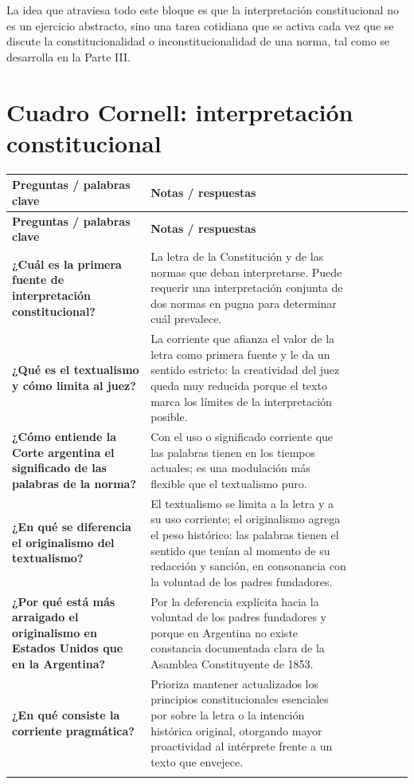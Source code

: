 \documentclass[12pt,oneside]{book}
\newcommand{\cornellhead}{%
    \toprule
    \textbf{Preguntas / palabras clave} & \textbf{Notas / respuestas} \\
    \midrule}
\newcommand{\cornellsep}{\\ \addlinespace \cmidrule[0.2pt]{1-2} \addlinespace}
\begin{document}
La idea que atraviesa todo este bloque es que la interpretación constitucional no es un ejercicio abstracto, sino una tarea cotidiana que se activa cada vez que se discute la constitucionalidad o inconstitucionalidad de una norma, tal como se desarrolla en la Parte III.

\section{Cuadro Cornell: interpretación constitucional}

\begin{longtable}{Q{0.28\textwidth}Q{\textwidth\relax}}
\cornellhead
\endfirsthead
\cornellhead
\endhead

\textbf{¿Cuál es la primera fuente de interpretación constitucional?} &
La letra de la Constitución y de las normas que deban interpretarse. Puede requerir una interpretación conjunta de dos normas en pugna para determinar cuál prevalece.
\cornellsep

\textbf{¿Qué es el textualismo y cómo limita al juez?} &
La corriente que afianza el valor de la letra como primera fuente y le da un sentido estricto: la creatividad del juez queda muy reducida porque el texto marca los límites de la interpretación posible.
\cornellsep

\textbf{¿Cómo entiende la Corte argentina el significado de las palabras de la norma?} &
Con el uso o significado corriente que las palabras tienen en los tiempos actuales; es una modulación más flexible que el textualismo puro.
\cornellsep

\textbf{¿En qué se diferencia el originalismo del textualismo?} &
El textualismo se limita a la letra y a su uso corriente; el originalismo agrega el peso histórico: las palabras tienen el sentido que tenían al momento de su redacción y sanción, en consonancia con la voluntad de los padres fundadores.
\cornellsep

\textbf{¿Por qué está más arraigado el originalismo en Estados Unidos que en la Argentina?} &
Por la deferencia explícita hacia la voluntad de los padres fundadores y porque en Argentina no existe constancia documentada clara de la Asamblea Constituyente de 1853.
\cornellsep

\textbf{¿En qué consiste la corriente pragmática?} &
Prioriza mantener actualizados los principios constitucionales esenciales por sobre la letra o la intención histórica original, otorgando mayor proactividad al intérprete frente a un texto que envejece.
\cornellsep


\end{longtable}
\end{document}
